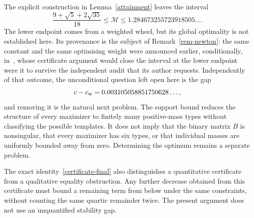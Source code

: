 The explicit construction in Lemma~\ref{attainment} leaves the interval
\[
 \frac{9+\sqrt5+2\sqrt{35}}{18}\le\mathcal M
       \le1.284673255723918505\ldots.
\]
The lower endpoint comes from a weighted wheel, but its global optimality
is not established here. Its provenance is the subject of
Remark~\ref{rem-newton}: the same constant and the same optimising weight
were announced earlier, conditionally, in~\cite{Newton1,Newton2}, whose
certificate argument would close the interval at the lower endpoint were it
to survive the independent audit that its author requests. Independently of
that outcome, the unconditional question left open here is the gap
\[
 c-c_{\mathrm{w}}=0.003105058851750628\ldots,
\]
and removing it is the natural next problem. The support bound reduces the
structure of every
maximizer to finitely many positive-mass types without classifying the
possible templates. It does not imply that the binary matrix $B$ is
nonsingular, that every maximizer has six types, or that individual masses
are uniformly bounded away from zero. Determining the optimum remains
a separate problem.

The exact identity~\eqref{certificate-final} also distinguishes a
quantitative certificate from a qualitative equality obstruction. Any
further decrease obtained from this certificate must bound a remaining term from below
under the same constraints, without counting the same quartic remainder
twice. The present argument does not use an unquantified stability gap.
